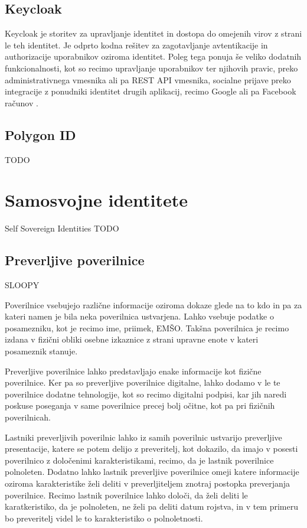\documentclass[a4paper,12pt,openright]{book}
\begin{document}
\subsection{Keycloak} \label{keycloak}
Keycloak je storitev za upravljanje identitet in dostopa do omejenih virov z strani le teh identitet.
Je odprto kodna rešitev za zagotavljanje avtentikacije in authorizacije uporabnikov oziroma identitet.
Poleg tega ponuja še veliko dodatnih funkcionalnosti, kot so recimo upravljanje uporabnikov ter njihovih pravic,
preko administrativnega vmesnika ali pa REST API vmesnika,
socialne prijave preko integracije z ponudniki identitet drugih aplikacij, recimo Google ali pa Facebook računov \cite{keycloak}.

\subsection{Polygon ID} \label{polygon_id}
TODO


\section{Samosvojne identitete}
Self Sovereign Identities
TODO


\subsection{Preverljive poverilnice}
SLOOPY

Poverilnice vsebujejo različne informacije oziroma dokaze glede na to kdo in pa za kateri namen je bila neka poverilnica ustvarjena.
Lahko vsebuje podatke o posamezniku, kot je recimo ime, priimek, EMŠO.
Takšna poverilnica je recimo izdana v fizični obliki osebne izkaznice z strani upravne enote v kateri posameznik stanuje.

Preverljive poverilnice lahko predstavljajo enake informacije kot fizične poverilnice.
Ker pa so preverljive poverilnice digitalne, lahko dodamo v le te poverilnice dodatne tehnologije, 
kot so recimo digitalni podpisi, kar jih naredi poskuse poseganja v same poverilnice precej bolj očitne, kot pa pri fizičnih poverilnicah.

Lastniki preverljivih poverilnic lahko iz samih poverilnic ustvarijo preverljive presentacije, katere se potem delijo z preveritelj, kot dokazilo, da imajo v posesti
poverilnico z določenimi karakteristikami, recimo, da je lastnik poverilnice polnoleten.
Dodatno lahko lastnik preverljive poverilnice omeji katere informacije oziroma karakteristike želi deliti v preverljiteljem znotraj postopka preverjanja poverilnice.
Recimo lastnik poverilnice lahko določi, da želi deliti le karatkeristiko, da je polnoleten, ne želi pa deliti datum rojstva, in v 
tem primeru bo preveritelj videl le to karakteristiko o polnoletnosti.
\end{document}
